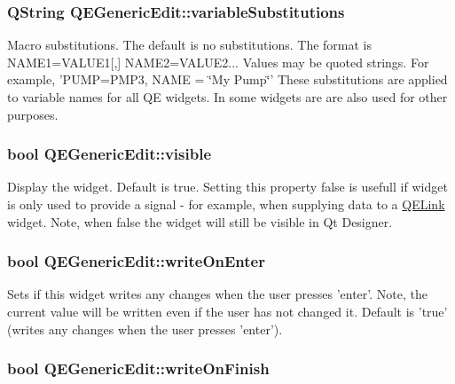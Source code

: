 \hypertarget{classQEGenericEdit_a4cbf09c0d505553217dc9880d0987382}{
\subsubsection[{variableSubstitutions}]{\setlength{\rightskip}{0pt plus 5cm}QString QEGenericEdit::variableSubstitutions}}
\label{classQEGenericEdit_a4cbf09c0d505553217dc9880d0987382}
Macro substitutions. The default is no substitutions. The format is NAME1=VALUE1\mbox{[},\mbox{]} NAME2=VALUE2... Values may be quoted strings. For example, 'PUMP=PMP3, NAME = \char`\"{}My Pump\char`\"{}' These substitutions are applied to variable names for all QE widgets. In some widgets are are also used for other purposes. \hypertarget{classQEGenericEdit_af3d5533b501f2d763431cb1b5b2aa7e0}{
\subsubsection[{visible}]{\setlength{\rightskip}{0pt plus 5cm}bool QEGenericEdit::visible}}
\label{classQEGenericEdit_af3d5533b501f2d763431cb1b5b2aa7e0}
Display the widget. Default is true. Setting this property false is usefull if widget is only used to provide a signal -\/ for example, when supplying data to a \hyperlink{classQELink}{QELink} widget. Note, when false the widget will still be visible in Qt Designer. \hypertarget{classQEGenericEdit_a4555b5e4928e65bde2f522e26078fa84}{
\subsubsection[{writeOnEnter}]{\setlength{\rightskip}{0pt plus 5cm}bool QEGenericEdit::writeOnEnter}}
\label{classQEGenericEdit_a4555b5e4928e65bde2f522e26078fa84}
Sets if this widget writes any changes when the user presses 'enter'. Note, the current value will be written even if the user has not changed it. Default is 'true' (writes any changes when the user presses 'enter'). \hypertarget{classQEGenericEdit_a72daabd68fba3750b5633a9ec610e5d3}{
\subsubsection[{writeOnFinish}]{\setlength{\rightskip}{0pt plus 5cm}bool QEGenericEdit::writeOnFinish}}
